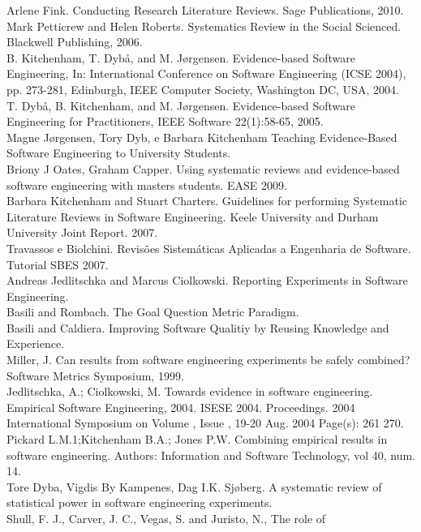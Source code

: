 \documentclass[
	12pt,				%
	openright,			%
  oneside,     %
	a4paper,			%
	chapter=TITLE,		%
	english,			%
	french,				%
	spanish,			%
	brazil				%
	]{abntex2}
\begin{document}
\begin{apendicesenv}
Arlene Fink. Conducting Research Literature Reviews. Sage Publications,
2010.\\Mark Petticrew and Helen Roberts. Systematics Review in the Social
Scienced. Blackwell Publishing, 2006.\\
B. Kitchenham, T. Dybå, and M. Jørgensen. Evidence-based Software
Engineering, In: International Conference on Software Engineering
(ICSE 2004), pp. 273-281, Edinburgh, IEEE Computer
Society, Washington DC, USA, 2004. \\
T. Dybå, B. Kitchenham, and M. Jørgensen. Evidence-based Software
Engineering for Practitioners, IEEE Software 22(1):58-65, 2005.\\
Magne Jørgensen, Tory Dyb, e Barbara Kitchenham Teaching Evidence-Based
Software Engineering to University Students.\\
Briony J Oates, Graham Capper. Using systematic reviews and
evidence-based software engineering with masters students. EASE 2009.\\
Barbara Kitchenham and Stuart Charters. Guidelines for performing
Systematic Literature Reviews in Software Engineering. Keele University
and Durham University Joint Report. 2007.\\
Travassos e Biolchini. Revisões Sistemáticas Aplicadas a Engenharia de
Software. Tutorial SBES 2007.\\
Andreas Jedlitschka and Marcus Ciolkowski. Reporting Experiments in
Software Engineering.\\
Basili and Rombach. The Goal Question Metric Paradigm.\\
Basili and Caldiera. Improving Software Qualitiy by Reusing Knowledge
and Experience.\\
Miller, J. Can results from software engineering experiments be safely
combined? Software Metrics Symposium, 1999. \\
Jedlitschka, A.; Ciolkowski, M. Towards evidence in software
engineering. Empirical Software Engineering, 2004.
ISESE 2004. Proceedings. 2004 International Symposium on
Volume , Issue , 19-20 Aug. 2004 Page(s): 261  270.\\
Pickard L.M.1;Kitchenham B.A.; Jones P.W. Combining empirical results in
software engineering. Authors: Information and Software Technology, vol
40, num. 14.\\
Tore Dyba, Vigdis By Kampenes, Dag I.K. Sjøberg. A systematic review of
statistical power in software engineering experiments.\\
Shull, F. J., Carver, J. C., Vegas, S. and Juristo, N., The role of

\end{apendicesenv}
\end{document}
